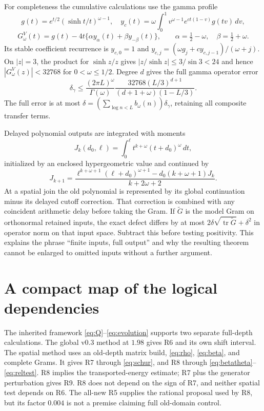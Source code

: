 \documentclass[11pt]{article}
\theoremstyle{remark}\newtheorem{remark}[theorem]{Remark}
\begin{document}
For completeness the cumulative calculations use the gamma profile
\[
 g(t)=e^{t/2}(\sinh t/t)^{\omega-1},\quad
 y_c(t)=\omega\int_0^1v^{\omega-1}e^{ct(1-v)}g(tv)\,dv,
\]
\[
 G^V_\omega(t)=g(t)-4t\{\alpha y_\alpha(t)+\beta y_{-\beta}(t)\},\qquad
 \alpha=\tfrac12-\omega,\quad\beta=\tfrac12+\omega.
\]
Its stable coefficient recurrence is $y_{c,0}=1$ and
$y_{c,j}=(\omega g_j+cy_{c,j-1})/(\omega+j)$. On $|z|=3$, the product for $\sinh z/z$ gives $|z/\sinh z|\le3/\sin3<24$ and hence $|G^V_\omega(z)|<32768$ for $0<\omega\le1/2$. Degree $d$ gives the full gamma operator error
\[
 \delta_\gamma\le\frac{(2\pi L)^\omega}{\Gamma(\omega)}
 \frac{32768(L/3)^{d+1}}{(d+1+\omega)(1-L/3)}.
\]
The full error is at most $\delta=(\sum_{\log n<L}b_\omega(n))\delta_\gamma$, retaining all composite transfer terms.

Delayed polynomial outputs are integrated with moments
\[
 J_k(d_0,\ell)=\int_0^\ell t^{k+\omega}(t+d_0)^\omega\,dt,
\]
initialized by an enclosed hypergeometric value and continued by
\[
 J_{k+1}=\frac{\ell^{k+\omega+1}(\ell+d_0)^{\omega+1}-d_0(k+\omega+1)J_k}{k+2\omega+2}.
\]
At a spatial join the old polynomial is represented by its global continuation minus its delayed cutoff correction. That correction is combined with any coincident arithmetic delay before taking the Gram. If $\widetilde G$ is the model Gram on orthonormal retained inputs, the exact defect differs by at most
$2\delta\sqrt{\operatorname{tr}\widetilde G}+\delta^2$ in operator norm on that input space. Subtract this before testing positivity. This explains the phrase ``finite inputs, full output'' and why the resulting theorem cannot be enlarged to omitted inputs without a further argument.

\section{A compact map of the logical dependencies}

The inherited framework \eqref{eq:Q}--\eqref{eq:evolution} supports two separate full-depth calculations. The global v0.3 method at $1.98$ gives R6 and its own shift interval. The spatial method uses an old-depth matrix build, \eqref{eq:rho}, \eqref{eq:beta}, and complete Grams. It gives R7 through \eqref{eq:schur}, and R8 through \eqref{eq:betatheta}--\eqref{eq:reltest}. R8 implies the transported-energy estimate; R7 plus the generator perturbation gives R9. R8 does not depend on the sign of R7, and neither spatial test depends on R6. The all-new R5 supplies the rational proposal used by R8, but its factor $0.004$ is not a premise claiming full old-domain control.
\end{document}
